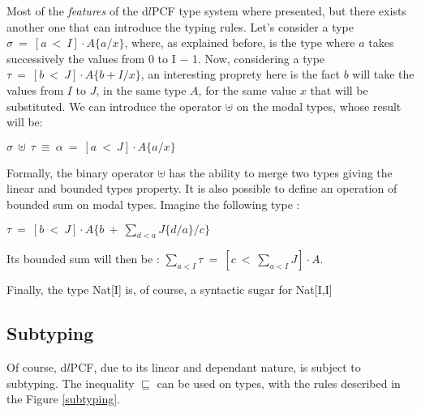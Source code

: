 \documentclass[a4paper,12pt]{article}
\begin{document}
Most of the \emph{features} of the d$l$PCF type system where presented, but
there exists another one that can introduce the typing rules. Let's consider a
type $\sigma~=~[a~<~I] \cdot A\{a/x\}$, where, as explained before, is the type
where $a$ takes successively the values from 0 to I $-$ 1. Now, considering a
type $\tau~=~[b~<~J] \cdot A\{b+I/x\}$, an interesting proprety here is the fact
$b$ will take the values from $I$ to $J$, in the same type $A$, for the same value
$x$ that will be substituted. We can introduce the operator $\uplus$ on the
modal types, whose result will be:

\begin{center}
$\sigma~\uplus~\tau~\equiv~\alpha~=~[a~<~J] \cdot A\{a/x\}$
\end{center}

Formally, the binary operator $\uplus$ has the ability to merge two types giving
the linear and bounded types property. It is also possible to define an
operation of bounded sum on modal types. Imagine the following type :

\begin{center}
  $\tau~=~[b~<~J] \cdot A\{b~+~\sum_{d<a}J\{d/a\}/c\}$
\end{center}

Its bounded sum will then be : $\sum_{a<I} \tau ~=~ [c~<~\sum_{a<I}J] \cdot A$. 

Finally, the type Nat[I] is, of course, a syntactic sugar for Nat[I,I]

\subsection{Subtyping}

Of course, d$l$PCF, due to its linear and dependant nature, is subject to
subtyping. The inequality $\sqsubseteq$ can be used on types, with the rules
described in the Figure \ref{subtyping}.
\end{document}
